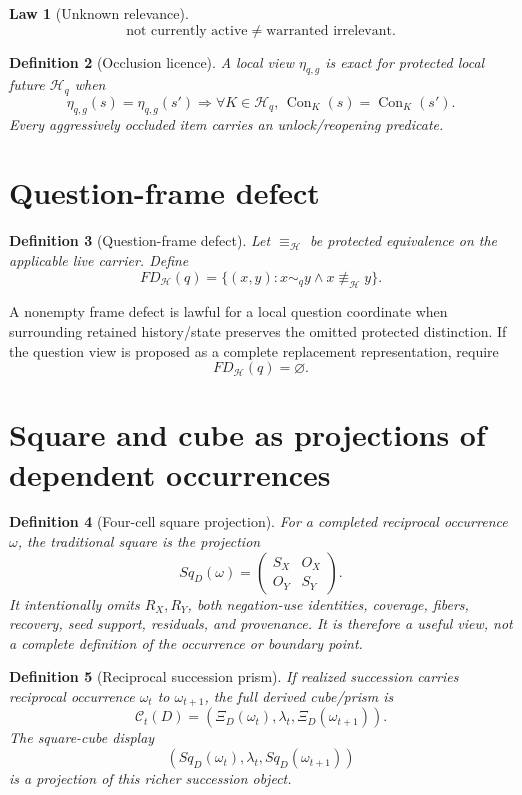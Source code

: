 \documentclass[11pt,oneside]{article}
\newtheorem{definition}{Definition}[section]
\newtheorem{law}[definition]{Law}
\newcommand{\Con}{\operatorname{Con}}
\begin{document}
\begin{law}[Unknown relevance]
\[
\boxed{
\text{not currently active}
\neq
\text{warranted irrelevant}.
}
\]
\end{law}

\begin{definition}[Occlusion licence]
A local view \(\eta_{q,g}\) is exact for protected local future \(\mathcal H_q\) when
\[
\eta_{q,g}(s)=\eta_{q,g}(s')
\Longrightarrow
\forall K\in\mathcal H_q,\,
\Con_K(s)=\Con_K(s').
\]
Every aggressively occluded item carries an unlock/reopening predicate.
\end{definition}

\section{Question-frame defect}

\begin{definition}[Question-frame defect]
Let \(\equiv_{\mathcal H}\) be protected equivalence on the applicable live carrier.  Define
\[
\boxed{
FD_{\mathcal H}(q)
=
\{(x,y):x\sim_q y\land x\not\equiv_{\mathcal H}y\}.
}
\]
\end{definition}

A nonempty frame defect is lawful for a local question coordinate when surrounding retained history/state preserves the omitted protected distinction.  If the question view is proposed as a complete replacement representation, require
\[
\boxed{FD_{\mathcal H}(q)=\varnothing.}
\]

\section{Square and cube as projections of dependent occurrences}

\begin{definition}[Four-cell square projection]
For a completed reciprocal occurrence \(\omega\), the traditional square is the projection
\[
\boxed{
Sq_D(\omega)
=
\begin{pmatrix}
S_X & O_X\\
O_Y & S_Y
\end{pmatrix}.
}
\]
It intentionally omits \(R_X,R_Y\), both negation-use identities, coverage, fibers, recovery, seed support, residuals, and provenance.  It is therefore a useful view, not a complete definition of the occurrence or boundary point.
\end{definition}

\begin{definition}[Reciprocal succession prism]
If realized succession carries reciprocal occurrence \(\omega_t\) to \(\omega_{t+1}\), the full derived cube/prism is
\[
\boxed{
\mathcal C_t(D)
=
(\Xi_D(\omega_t),\lambda_t,\Xi_D(\omega_{t+1})).
}
\]
The square-cube display
\[
(Sq_D(\omega_t),\lambda_t,Sq_D(\omega_{t+1}))
\]
is a projection of this richer succession object.
\end{definition}
\end{document}
